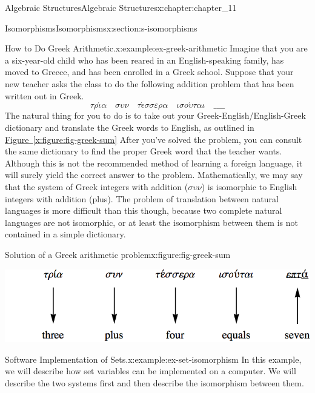 \documentclass[oneside,10pt,]{book}
\newcommand{\xreffont}{\relax}
\numberwithin{equation}{section}
\begin{document}
\begin{chapterptx}{Algebraic Structures}{}{Algebraic Structures}{}{}{x:chapter:chapter_11}
\begin{sectionptx}{Isomorphisms}{}{Isomorphisms}{}{}{x:section:s-isomorphisms}
\begin{introduction}{}
\begin{example}{How to Do Greek Arithmetic.}{x:example:ex-greek-arithmetic}%
Imagine that you are a six-year-old child who has been reared in an English-speaking family, has moved to Greece, and has been enrolled in a Greek school. Suppose that your new teacher asks the class to do the following addition problem that has been written out in Greek.%
\begin{equation*}
\tau \rho \acute{\iota} \alpha \quad \sigma \upsilon \nu \quad  \tau \acute{\epsilon} \sigma \sigma \varepsilon \rho \alpha \quad \iota \sigma o \acute{\upsilon} \tau \alpha \iota \quad \_\_\_\_
\end{equation*}
The natural thing for you to do is to take out your Greek-English\slash{}English-Greek dictionary and translate the Greek words to English, as outlined in \hyperref[x:figure:fig-greek-sum]{Figure~{\xreffont\ref{x:figure:fig-greek-sum}}} After you've solved the problem, you can consult the same dictionary to find the proper Greek word that the teacher wants. Although this is not the recommended method of learning a foreign language, it will surely yield the correct answer to the problem. Mathematically, we may say that the system of Greek integers with addition (\(\sigma \upsilon \nu\)) is isomorphic to English integers with addition (plus). The problem of translation between natural languages is more difficult than this though, because two complete natural languages are not isomorphic, or at least the isomorphism between them is not contained in a simple dictionary.%
\begin{figureptx}{Solution of a Greek arithmetic problem}{x:figure:fig-greek-sum}{}%
\begin{image}{0.15}{0.7}{0.15}%
\includegraphics[width=\linewidth]{images/fig-greek-sum.png}
\end{image}%
\tcblower
\end{figureptx}%
\end{example}
\begin{example}{Software Implementation of Sets.}{x:example:ex-set-isomorphism}%
In this example, we will describe how set  variables can be implemented on a computer. We will describe the two systems first and then describe the isomorphism between them.%

\end{example}
\end{introduction}
\end{sectionptx}
\end{chapterptx}
\end{document}

